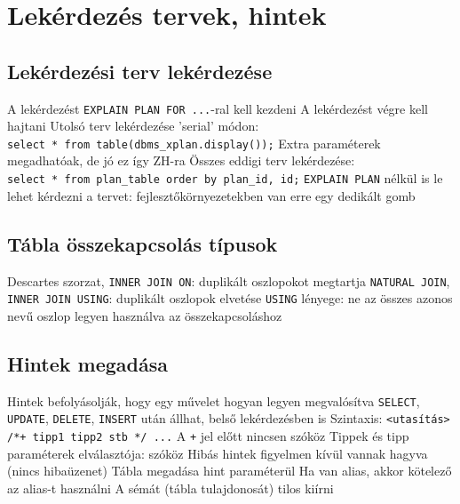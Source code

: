 \documentclass[12pt,a4paper]{article}
\begin{document}
\pagebreak

\section{Lekérdezés tervek, hintek}

\subsection{Lekérdezési terv lekérdezése}

\begin{outline}
	\1 A lekérdezést \texttt{EXPLAIN PLAN FOR ...}-ral kell kezdeni
	\1 A lekérdezést végre kell hajtani
	\1 Utolsó terv lekérdezése 'serial' módon:\\
	\texttt{select * from table(dbms\_xplan.display());}
		\2 Extra paraméterek megadhatóak, de jó ez így ZH-ra
	\1 Összes eddigi terv lekérdezése:\\
	\texttt{select * from plan\_table order by plan\_id, id;}
	\1 \texttt{EXPLAIN PLAN} nélkül is le lehet kérdezni a tervet: fejlesztőkörnyezetekben van erre egy dedikált gomb
\end{outline}

\subsection{Tábla összekapcsolás típusok}

\begin{outline}
	\1 Descartes szorzat, \texttt{INNER JOIN ON}: duplikált oszlopokot megtartja
	\1 \texttt{NATURAL JOIN}, \texttt{INNER JOIN USING}: duplikált oszlopok elvetése
		\2 \texttt{USING} lényege: ne az összes azonos nevű oszlop legyen használva az összekapcsoláshoz
\end{outline}

\subsection{Hintek megadása}

\begin{outline}
	\1 Hintek befolyásolják, hogy egy művelet hogyan legyen megvalósítva
	\1 \texttt{SELECT}, \texttt{UPDATE}, \texttt{DELETE}, \texttt{INSERT} után állhat,
	belső lekérdezésben is
	\1 Szintaxis: \texttt{<utasítás> /*+ tipp1 tipp2 stb */ ...}
		\2 A \texttt{+} jel előtt nincsen szóköz
		\2 Tippek és tipp paraméterek elválasztója: szóköz
	\1 Hibás hintek figyelmen kívül vannak hagyva (nincs hibaüzenet)
	\1 Tábla megadása hint paraméterül
		\2 Ha van alias, akkor kötelező az alias-t használni
		\2 A sémát (tábla tulajdonosát) tilos kiírni
\end{outline}
\end{document}
